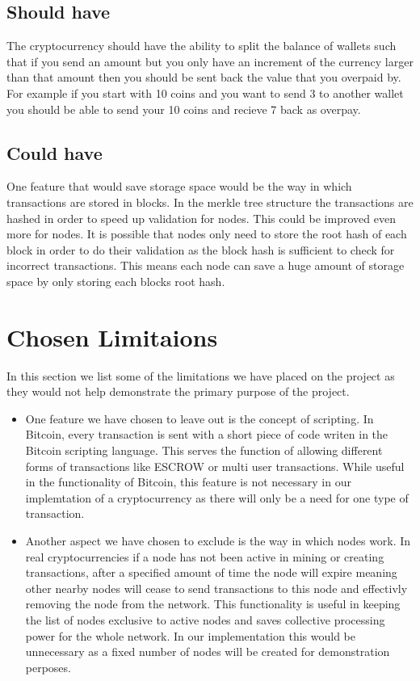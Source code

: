 \documentclass{l4proj}
\begin{document}
\subsection{Should have}
The cryptocurrency should have the ability to split the balance of wallets such that if you send an amount but you only
have an increment of the currency larger than that amount then you should be sent back the value that you overpaid by.
For example if you start with 10 coins and you want to send 3 to another wallet you should be able to send your 10 coins
and recieve 7 back as overpay.

\subsection{Could have}
One feature that would save storage space would be the way in which transactions are stored in blocks. In the merkle tree
structure the transactions are hashed in order to speed up validation for nodes. This could be improved even more for 
nodes. It is possible that nodes only need to store the root hash of each block in order to do their validation as the
block hash is sufficient to check for incorrect transactions. This means each node can save a huge amount of storage space
by only storing each blocks root hash.

\section{Chosen Limitaions}
In this section we list some of the limitations we have placed on the project as they would not help demonstrate the 
primary purpose of the project.
\begin{itemize}
    \item One feature we have chosen to leave out is the concept of scripting. In Bitcoin, every transaction is sent
        with a short piece of code writen in the Bitcoin scripting language. This serves the function of allowing 
        different forms of transactions like ESCROW or multi user transactions. While useful in the functionality of
        Bitcoin, this feature is not necessary in our implemtation of a cryptocurrency as there will only be a need
        for one type of transaction.
    \item Another aspect we have chosen to exclude is the way in which nodes work. In real cryptocurrencies if a node
        has not been active in mining or creating transactions, after a specified amount of time the node will expire
        meaning other nearby nodes will cease to send transactions to this node and effectivly removing the node from
        the network. This functionality is useful in keeping the list of nodes exclusive to active nodes and saves
        collective processing power for the whole network. In our implementation this would be unnecessary as a fixed
        number of nodes will be created for demonstration perposes.
\end{itemize}
\end{document}
